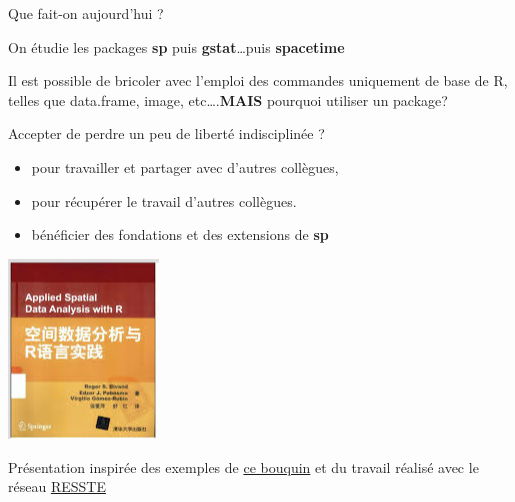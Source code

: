 \documentclass[8pt,ignorenonframetext,]{beamer}
\providecommand{\tightlist}{%
\setlength{\itemsep}{0pt}\setlength{\parskip}{0pt}}
\begin{document}
\begin{frame}{Que fait-on aujourd'hui ?}

On étudie les packages \textbf{sp} puis \textbf{gstat}\ldots{}puis
\textbf{spacetime}

Il est possible de bricoler avec l'emploi des commandes uniquement de
base de R, telles que data.frame, image, etc\ldots{}.\textbf{MAIS}
pourquoi utiliser un package?

Accepter de perdre un peu de liberté indisciplinée ?

\begin{itemize}
\tightlist
\item
  pour travailler et partager avec d'autres collègues,
\item
  pour récupérer le travail d'autres collègues.
\item
  bénéficier des fondations et des extensions de \textbf{sp}
\end{itemize}

\begin{center}
  \includegraphics[width=0.3\textwidth]{figbookbivand.png}
\end{center}

Présentation inspirée des exemples de \href{http://asdar-book.org}{ce
bouquin} et du travail réalisé avec le réseau
\href{http://informatique-mia.inra.fr/resste/atelier}{RESSTE}

\end{frame}
\end{document}
